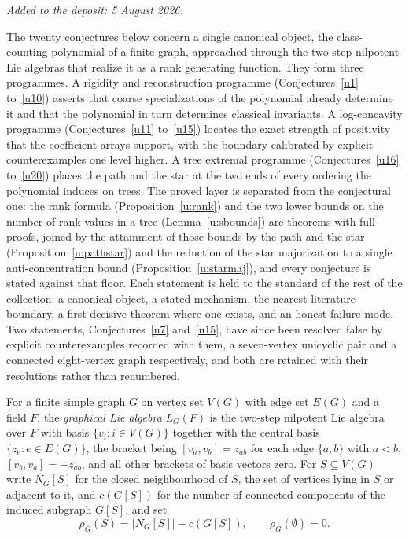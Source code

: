 \documentclass[11pt]{article}
\theoremstyle{definition}
\begin{document}
\medskip\noindent\emph{Added to the deposit: 5 August 2026.}\par\medskip

The twenty conjectures below concern a single canonical object, the class-counting polynomial of a finite graph, approached through the two-step nilpotent Lie algebras that realize it as a rank generating function.  They form three programmes.  A rigidity and reconstruction programme (Conjectures~\ref{u1} to~\ref{u10}) asserts that coarse specializations of the polynomial already determine it and that the polynomial in turn determines classical invariants.  A log-concavity programme (Conjectures~\ref{u11} to~\ref{u15}) locates the exact strength of positivity that the coefficient arrays support, with the boundary calibrated by explicit counterexamples one level higher.  A tree extremal programme (Conjectures~\ref{u16} to~\ref{u20}) places the path and the star at the two ends of every ordering the polynomial induces on trees.  The proved layer is separated from the conjectural one: the rank formula (Proposition~\ref{u:rank}) and the two lower bounds on the number of rank values in a tree (Lemma~\ref{u:sbounds}) are theorems with full proofs, joined by the attainment of those bounds by the path and the star (Proposition~\ref{u:pathstar}) and the reduction of the star majorization to a single anti-concentration bound (Proposition~\ref{u:starmaj}), and every conjecture is stated against that floor.  Each statement is held to the standard of the rest of the collection: a canonical object, a stated mechanism, the nearest literature boundary, a first decisive theorem where one exists, and an honest failure mode.  Two statements, Conjectures~\ref{u7} and~\ref{u15}, have since been resolved false by explicit counterexamples recorded with them, a seven-vertex unicyclic pair and a connected eight-vertex graph respectively, and both are retained with their resolutions rather than renumbered.

For a finite simple graph $G$ on vertex set $V(G)$ with edge set $E(G)$ and a field $F$, the \emph{graphical Lie algebra} $L_G(F)$ is the two-step nilpotent Lie algebra over $F$ with basis $\{v_i:i\in V(G)\}$ together with the central basis $\{z_e:e\in E(G)\}$, the bracket being $[v_a,v_b]=z_{ab}$ for each edge $\{a,b\}$ with $a<b$, $[v_b,v_a]=-z_{ab}$, and all other brackets of basis vectors zero.  For $S\subseteq V(G)$ write $N_G[S]$ for the closed neighbourhood of $S$, the set of vertices lying in $S$ or adjacent to it, and $c(G[S])$ for the number of connected components of the induced subgraph $G[S]$, and set
\[
\rho_G(S)=\bigl|N_G[S]\bigr|-c(G[S]),\qquad\rho_G(\emptyset)=0 .
\]
\end{document}
